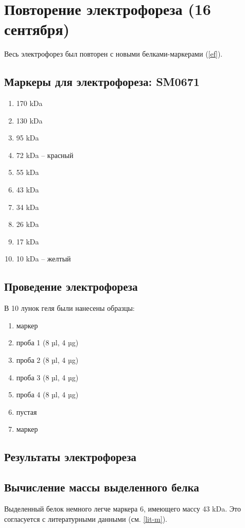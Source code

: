 \section{Повторение электрофореза (16 сентября)}

Весь электрофорез был повторен с новыми белками-маркерами (\ref{ef}).

\subsection{Маркеры для электрофореза: SM0671}
\begin{enumerate}
\item 170 kDa
\item 130 kDa
\item 95 kDa
\item 72 kDa -- красный
\item 55 kDa
\item 43 kDa
\item 34 kDa
\item 26 kDa
\item 17 kDa
\item 10 kDa -- желтый
\end{enumerate}

\subsection{Проведение электрофореза}
В 10 лунок геля были нанесены образцы:
\begin{enumerate}
\item маркер
\item проба 1 (8 µl, 4 µg)
\item проба 2 (8 µl, 4 µg)
\item проба 3 (8 µl, 4 µg)
\item проба 4 (8 µl, 4 µg)
\item пустая
\item маркер
\end{enumerate}


\subsection{Результаты электрофореза}
\def\svgwidth{0.7\linewidth}

\subsection{Вычисление массы выделенного белка}
Выделенный белок немного легче маркера 6, имеющего массу 43 kDa.
Это согласуется с литературными данными (см. \ref{lit-m}).

